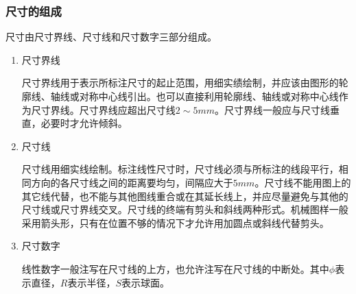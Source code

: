 \subsubsection{尺寸的组成}
尺寸由尺寸界线、尺寸线和尺寸数字三部分组成。
\begin{enumerate}
\item 尺寸界线

尺寸界线用于表示所标注尺寸的起止范围，用细实绩绘制，并应该由图形的轮廓线、轴线或对称中心线引出。也可以直接利用轮廓线、轴线或对称中心线作为尺寸界线。尺寸界线应超出尺寸线$2\sim 5mm$。尺寸界线一般应与尺寸线垂直，必要时才允许倾斜。
\item 尺寸线

尺寸线用细实线绘制。标注线性尺寸时，尺寸线必须与所标注的线段平行，相同方向的各尺寸线之间的距离要均匀，间隔应大于$5mm$。尺寸线不能用图上的其它线代替，也不能与其他图线重合或在其延长线上，并应尽量避免与其他的尺寸线或尺寸界线交叉。尺寸线的终端有剪头和斜线两种形式。机械图样一般采用箭头形，只有在位置不够的情况下才允许用加圆点或斜线代替剪头。
\item 尺寸数字

线性数字一般注写在尺寸线的上方，也允许注写在尺寸线的中断处。其中$\phi $表示直径，$R$表示半径，$S$表示球面。
\end{enumerate} 

